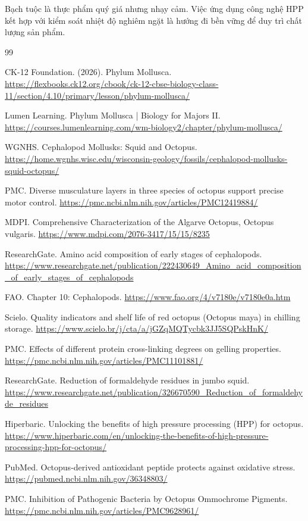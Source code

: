 \documentclass[12pt,a4paper]{report}
\begin{document}
Bạch tuộc là thực phẩm quý giá nhưng nhạy cảm. Việc ứng dụng công nghệ HPP kết hợp với kiểm soát nhiệt độ nghiêm ngặt là hướng đi bền vững để duy trì chất lượng sản phẩm.

\renewcommand{\bibname}{Tài liệu tham khảo Chương 1}
\begin{thebibliography}{99}

 CK-12 Foundation. (2026). Phylum Mollusca. \url{https://flexbooks.ck12.org/cbook/ck-12-cbse-biology-class-11/section/4.10/primary/lesson/phylum-mollusca/}

 Lumen Learning. Phylum Mollusca | Biology for Majors II. \url{https://courses.lumenlearning.com/wm-biology2/chapter/phylum-mollusca/}

 WGNHS. Cephalopod Mollusks: Squid and Octopus. \url{https://home.wgnhs.wisc.edu/wisconsin-geology/fossils/cephalopod-mollusks-squid-octopus/}

 PMC. Diverse musculature layers in three species of octopus support precise motor control. \url{https://pmc.ncbi.nlm.nih.gov/articles/PMC12419884/}

 MDPI. Comprehensive Characterization of the Algarve Octopus, Octopus vulgaris. \url{https://www.mdpi.com/2076-3417/15/15/8235}

 ResearchGate. Amino acid composition of early stages of cephalopods. \url{https://www.researchgate.net/publication/222430649_Amino_acid_composition_of_early_stages_of_cephalopods}

 FAO. Chapter 10: Cephalopods. \url{https://www.fao.org/4/v7180e/v7180e0a.htm}

 Scielo. Quality indicators and shelf life of red octopus (Octopus maya) in chilling storage. \url{https://www.scielo.br/j/cta/a/jGZqMQTycbk3JJ5SQPskHnK/}

 PMC. Effects of different protein cross-linking degrees on gelling properties. \url{https://pmc.ncbi.nlm.nih.gov/articles/PMC11101881/}

 ResearchGate. Reduction of formaldehyde residues in jumbo squid. \url{https://www.researchgate.net/publication/326670590_Reduction_of_formaldehyde_residues}

 Hiperbaric. Unlocking the benefits of high pressure processing (HPP) for octopus. \url{https://www.hiperbaric.com/en/unlocking-the-benefits-of-high-pressure-processing-hpp-for-octopus/}

 PubMed. Octopus-derived antioxidant peptide protects against oxidative stress. \url{https://pubmed.ncbi.nlm.nih.gov/36348803/}

 PMC. Inhibition of Pathogenic Bacteria by Octopus Ommochrome Pigments. \url{https://pmc.ncbi.nlm.nih.gov/articles/PMC9628961/}

\end{thebibliography}
\end{document}
